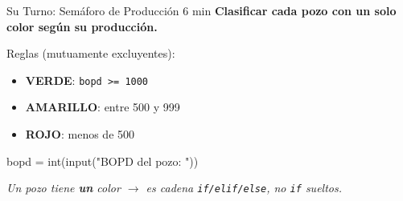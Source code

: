 \documentclass[aspectratio=169, 11pt]{beamer}
\begin{document}
\begin{frame}[fragile,shrink=6]{Su Turno: Semáforo de Producción \hfill {\normalsize\color{arcaRed}\faClock\hspace{4pt}6 min}}
  \vspace{-4pt}
  {\small\color{arcaDark}\bfseries
    Clasificar cada pozo con \textbf{un solo} color según su producción.}

  \vspace{3pt}
  {\footnotesize\color{textMuted}Reglas (mutuamente excluyentes):}

  \vspace{2pt}
  {\footnotesize
  \begin{itemize}\setlength{\itemsep}{2pt}
    \item[{\color{codeGreen}\bfseries \(\bullet\)}]
      \textbf{VERDE}: \texttt{bopd >= 1000}
    \item[{\color{codeOrange}\bfseries \(\bullet\)}]
      \textbf{AMARILLO}: entre 500 y 999
    \item[{\color{arcaRed}\bfseries \(\bullet\)}]
      \textbf{ROJO}: menos de 500
  \end{itemize}
  }

  \vspace{3pt}
  \begin{pyblock}
bopd = int(input("BOPD del pozo: "))
      \end{pyblock}

  \vspace{3pt}
  {\scriptsize\color{textMuted}\itshape
    \faLightbulb[regular]\hspace{3pt}%
    Un pozo tiene \textbf{un} color $\to$ es cadena \texttt{if/elif/else}, no \texttt{if} sueltos.}
\end{frame}
\end{document}

